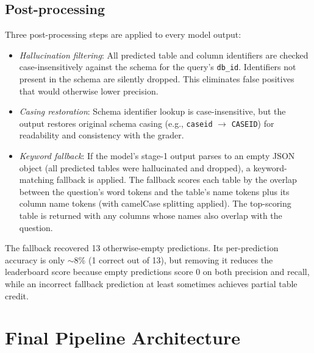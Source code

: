 \documentclass[10pt,twocolumn]{article}
\begin{document}
\subsection*{Post-processing}
Three post-processing steps are applied to every model output:

\begin{itemize}[noitemsep,topsep=2pt]
  \item \textit{Hallucination filtering}: All predicted table and column identifiers are checked case-insensitively against the schema for the query's \texttt{db\_id}. Identifiers not present in the schema are silently dropped. This eliminates false positives that would otherwise lower precision.
  \item \textit{Casing restoration}: Schema identifier lookup is case-insensitive, but the output restores original schema casing (e.g., \texttt{caseid} $\to$ \texttt{CASEID}) for readability and consistency with the grader.
  \item \textit{Keyword fallback}: If the model's stage-1 output parses to an empty JSON object (all predicted tables were hallucinated and dropped), a keyword-matching fallback is applied. The fallback scores each table by the overlap between the question's word tokens and the table's name tokens plus its column name tokens (with camelCase splitting applied). The top-scoring table is returned with any columns whose names also overlap with the question.
\end{itemize}

The fallback recovered 13 otherwise-empty predictions. Its per-prediction accuracy is only $\sim$8\% (1 correct out of 13), but removing it reduces the leaderboard score because empty predictions score 0 on both precision and recall, while an incorrect fallback prediction at least sometimes achieves partial table credit.

\section{Final Pipeline Architecture}
\end{document}
